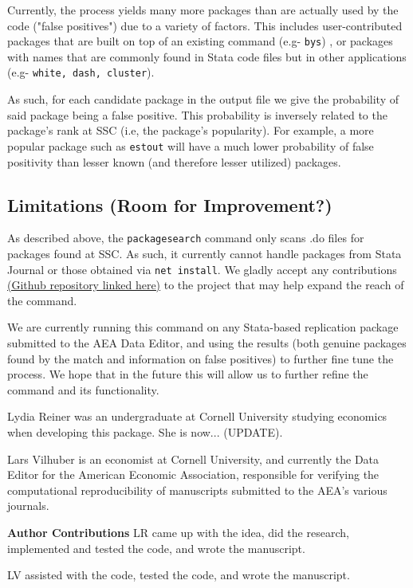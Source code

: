 Currently, the process yields many more packages than are actually used by the code ("false positives") due to a variety of factors. This includes user-contributed packages that are built on top of an existing command (e.g- \texttt{bys}) , or packages with names that are commonly found in Stata code files but in other applications (e.g- \texttt{white, dash, cluster}). 

As such, for each candidate package in the output file we give the probability of said package being a false positive. This probability is inversely related to the package's rank at SSC (i.e, the package's popularity). For example, a more popular package such as \texttt{estout} will have a much lower probability of false positivity than lesser known (and therefore lesser utilized) packages.


\subsection{Limitations (Room for Improvement?)}

As described above, the \texttt{packagesearch} command only scans .do files for packages found at SSC. As such, it currently cannot handle packages from Stata Journal or those obtained via \texttt{net install}. 
We gladly accept any contributions \href{https://github.com/lydreiner/Statapackagesearch}{(Github repository linked here)} to the project that may help expand the reach of the command.

We are currently running this command on any Stata-based replication package submitted to the AEA Data Editor, and using the results (both genuine packages found by the match and information on false positives) to further fine tune the process. We hope that in the future this will allow us to further refine the command and its functionality.  










\begin{aboutauthors}
Lydia Reiner was an undergraduate at Cornell University studying economics when developing this package. She is now... (UPDATE).

Lars Vilhuber is an economist at Cornell University, and currently the Data Editor for the American Economic Association, responsible for verifying the computational reproducibility of manuscripts submitted to the AEA's various journals.

\textbf{Author Contributions}
LR came up with the idea, did the research, implemented and tested the code, and wrote the manuscript.

LV assisted with the code, tested the code, and wrote the manuscript.

\end{aboutauthors}

